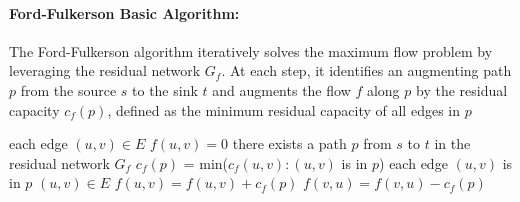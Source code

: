 \paragraph{Ford-Fulkerson Basic Algorithm:}
The Ford-Fulkerson algorithm iteratively solves the maximum flow problem by leveraging the residual network $G_f$. At each step, it identifies an augmenting path $p$ from the source $s$ to the sink $t$ and augments the flow $f$ along $p$ by the residual capacity $c_f(p)$, defined as the minimum residual capacity of all edges in $p$
\begin{codebox}
\li \For each edge $(u, v) \in E$ \Do
\li \quad $f(u,v) = 0$
    \End
\li \While there exists a path $p$ from $s$ to $t$ in the residual network $G_f$ \Do
\li \quad $c_f(p)$ = min($c_f(u,v):(u,v)$ is in $p$)
\li \quad \For each edge $(u, v)$ is in $p$ \Do
\li \quad \If $(u, v) \in E$ \Do
\li \quad  $f(u,v) = f(u,v) + c_f(p) $
\li \quad \Else $f(v,u) = f(v,u) - c_f(p) $
          \End
    \End
\end{codebox}

